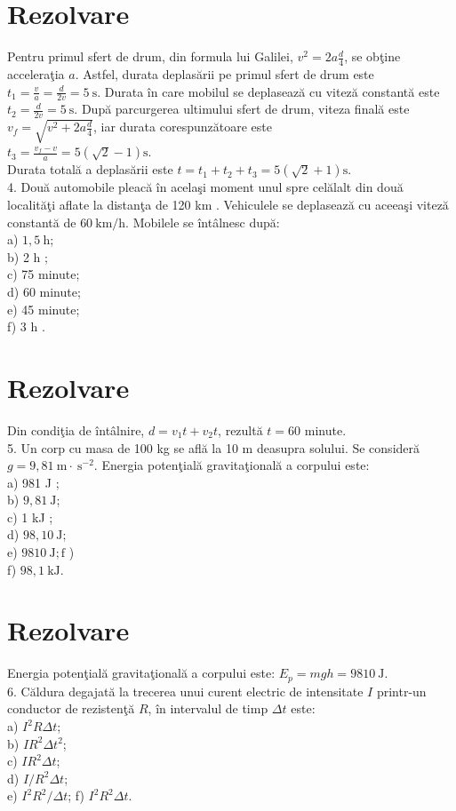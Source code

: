 \section*{Rezolvare}
Pentru primul sfert de drum, din formula lui Galilei, $v^{2}=2 a \frac{d}{4}$, se obţine acceleraţia $a$. Astfel, durata deplasării pe primul sfert de drum este $t_{1}=\frac{v}{a}=\frac{d}{2 v}=5 \mathrm{~s}$. Durata în care mobilul se deplasează cu viteză constantă este $t_{2}=\frac{d}{2 v}=5 \mathrm{~s}$. După parcurgerea ultimului sfert de drum, viteza finală este $v_{f}=\sqrt{v^{2}+2 a \frac{d}{4}}$, iar durata corespunzătoare este\\
$t_{3}=\frac{v_{f}-v}{a}=5(\sqrt{2}-1) \mathrm{s}$.\\
Durata totală a deplasării este $t=t_{1}+t_{2}+t_{3}=5(\sqrt{2}+1) \mathrm{s}$.\\
4. Două automobile pleacă în acelaşi moment unul spre celălalt din două localităţi aflate la distanţa de 120 km . Vehiculele se deplasează cu aceeaşi viteză constantă de $60 \mathrm{~km} / \mathrm{h}$. Mobilele se întâlnesc după:\\
a) $1,5 \mathrm{~h}$;\\
b) 2 h ;\\
c) 75 minute;\\
d) 60 minute;\\
e) 45 minute;\\
f) 3 h .

\section*{Rezolvare}
Din condiţia de întâlnire, $d=v_{1} t+v_{2} t$, rezultă $t=60$ minute.\\
5. Un corp cu masa de 100 kg se află la 10 m deasupra solului. Se consideră $g=9,81 \mathrm{~m} \cdot \mathrm{~s}^{-2}$. Energia potenţială gravitaţională a corpului este:\\
a) 981 J ;\\
b) $9,81 \mathrm{~J}$;\\
c) 1 kJ ;\\
d) $98,10 \mathrm{~J}$;\\
e) $9810 \mathrm{~J} ; \mathrm{f}$ )\\
f) $98,1 \mathrm{~kJ}$.

\section*{Rezolvare}
Energia potenţială gravitaţională a corpului este: $E_{p}=m g h=9810 \mathrm{~J}$.\\
6. Căldura degajată la trecerea unui curent electric de intensitate $I$ printr-un conductor de rezistenţă $R$, în intervalul de timp $\Delta t$ este:\\
a) $I^{2} R \Delta t$;\\
b) $I R^{2} \Delta t^{2}$;\\
c) $I R^{2} \Delta t$;\\
d) $I / R^{2} \Delta t$;\\
e) $I^{2} R^{2} / \Delta t$; f) $I^{2} R^{2} \Delta t$.

